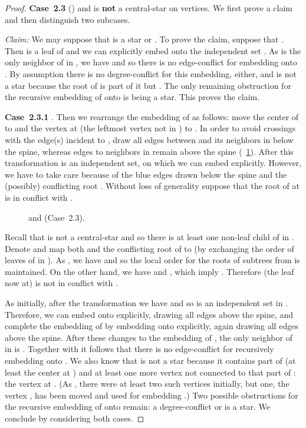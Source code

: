 \documentclass[11pt,a4paper,colorlinks=true,urlcolor=blue,citecolor=red]{article}
\theoremstyle{plain}
\newcommand{\case}[1]{\par\vspace{.5\baselineskip}\noindent\textbf{\sffamily Case~#1}}
\begin{document}
\begin{proof}
  \case{2.3}  () and
   is \textbf{not} a central-star  on
   vertices. We first prove a claim and then
  distinguish two subcases.

  \emph{Claim:} We may suppose that  is a star or . To prove
  the claim, suppose that . Then  is a leaf of
   and we can explicitly embed  onto the independent set
  . As  is the only neighbor of  in , we
  have  and so there is no edge-conflict for
  embedding  onto . By assumption there is no
  degree-conflict for this embedding, either, and  is not
  a star because the root of  is part of it but . The
  only remaining obstruction for the recursive embedding of  onto
   is  being a star. This proves the claim.

  \case{2.3.1} . Then we rearrange the
  embedding of  as follows: move the center  of  to 
  and the vertex  at  (the leftmost vertex not in ) to
  . In order to avoid crossings with the edge(s) incident to
  , draw all edges between  and its neighbors in 
  below the spine, whereas edges to neighbors in  remain
  above the spine (\figurename~\ref{fig:large_blue_star}). After this
  transformation  is an independent set, on which we can
  embed  explicitly. However, we have to take care because of the
  blue edges drawn below the spine and the (possibly) conflicting root
  . Without loss of generality suppose that the root of  at 
  is in conflict with .
\begin{figure}[htbp]
    \centering\hfil {}\hfil
    \hfil
    \caption{ and 
      (Case~2.3).\label{fig:large_blue_star}}
  \end{figure}


  Recall that  is not a central-star and so there is at least one
  non-leaf child  of  in . Denote  and map both 
  and the conflicting root of  to  (by exchanging the
  order of leaves of  in ). As , we have
   and so the local order for the roots of
  subtrees from  is maintained. On the other hand, we have
   and , which imply
  . Therefore (the leaf now
  at)  is not in conflict with .

  As  initially, after the transformation
  we have  and so
   is an independent set in . Therefore, we can
  embed  onto  explicitly, drawing all edges above the
  spine, and complete the embedding of  by embedding  onto  explicitly, again drawing all edges above the
  spine. After these changes to the embedding of , the only neighbor
  of  in  is . Together with  it follows
  that there is no edge-conflict for recursively embedding  onto
  . We also know that  is not a star because
  it contains part of  (at least the center at ) and at
  least one more vertex not connected to that part of : the vertex
  at . (As , there were at least two such vertices
  initially, but one, the vertex , has been moved and used for
  embedding .) Two possible obstructions for the recursive
  embedding of  onto  remain: a degree-conflict or 
  is a star. We conclude by considering both cases.


\end{proof}
\end{document}
